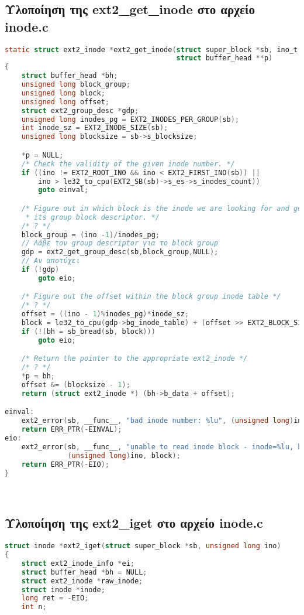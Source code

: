 \documentclass{article}
\begin{document}
\begin{enumerate}
\subsection{Υλοποίηση της ext2\_get\_inode στο αρχείο inode.c}
\begin{lstlisting}[language=C]
static struct ext2_inode *ext2_get_inode(struct super_block *sb, ino_t ino,
                                         struct buffer_head **p)
{
	struct buffer_head *bh;
	unsigned long block_group;
	unsigned long block;
	unsigned long offset;
	struct ext2_group_desc *gdp;
	unsigned long inodes_pg = EXT2_INODES_PER_GROUP(sb);
	int inode_sz = EXT2_INODE_SIZE(sb);
	unsigned long blocksize = sb->s_blocksize;

	*p = NULL;
	/* Check the validity of the given inode number. */
	if ((ino != EXT2_ROOT_INO && ino < EXT2_FIRST_INO(sb)) ||
	    ino > le32_to_cpu(EXT2_SB(sb)->s_es->s_inodes_count))
		goto einval;

	/* Figure out in which block is the inode we are looking for and get
	 * its group block descriptor. */
	/* ? */
    block_group = (ino -1)/inodes_pg;
    // Λάβε τον group descriptor για το block group
    gdp = ext2_get_group_desc(sb,block_group,NULL);
    // Αν αποτύχει 
    if (!gdp)
        goto eio;

	/* Figure out the offset within the block group inode table */
	/* ? */
    offset = ((ino - 1)%inodes_pg)*inode_sz;
    block = le32_to_cpu(gdp->bg_inode_table) + (offset >> EXT2_BLOCK_SIZE_BITS(sb));
	if (!(bh = sb_bread(sb, block)))
		goto eio;

	/* Return the pointer to the appropriate ext2_inode */
	/* ? */
	*p = bh;
	offset &= (blocksize - 1);
	return (struct ext2_inode *) (bh->b_data + offset);

einval:
	ext2_error(sb, __func__, "bad inode number: %lu", (unsigned long)ino);
	return ERR_PTR(-EINVAL);
eio:
	ext2_error(sb, __func__, "unable to read inode block - inode=%lu, block=%lu",
	           (unsigned long)ino, block);
	return ERR_PTR(-EIO);
}
\end{lstlisting} \\

\subsection{Υλοποίηση της ext2\_iget στο αρχείο inode.c}
\begin{lstlisting}[language=C]
struct inode *ext2_iget(struct super_block *sb, unsigned long ino)
{
	struct ext2_inode_info *ei;
	struct buffer_head *bh = NULL;
	struct ext2_inode *raw_inode;
	struct inode *inode;
	long ret = -EIO;
	int n;


\end{lstlisting}
\end{enumerate}
\end{document}
